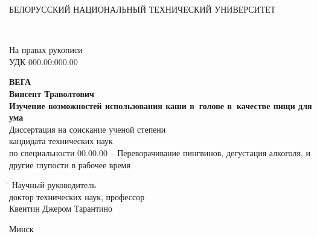 \begin{titlepage}


\begin{center} %
{БЕЛОРУССКИЙ НАЦИОНАЛЬНЫЙ ТЕХНИЧЕСКИЙ УНИВЕРСИТЕТ}
\end{center}
~\medskip


\noindent На правах рукописи\\

\noindent УДК  000.00:000.00 \\

\vspace{3cm}

\begin{center}
{\large \bfseries ВЕГА \\ Винсент Траволтович}\\
\vspace{1cm}
{\large \bfseries Изучение возможностей использования каши в~голове в~качестве пищи для ума}\\ 
\vspace{2cm}
{Диссертация на соискание ученой степени}\\
{кандидата технических наук}\\
{по специальности 00.00.00 -- Переворачивание пингвинов, дегустация алкоголя, и другие глупости в рабочее время}
\end{center}

\vspace{3cm}

\begin{tabbing}
\hspace{8cm} \= \kill \>
Научный руководитель \+ \\
доктор технических наук, профессор\\
Квентин Джером Тарантино\\
\end{tabbing}

\vspace{5cm}
\begin{center} %
Минск \the\year
\end{center}

\end{titlepage}
